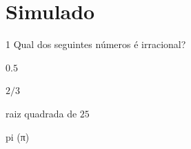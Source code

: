 



%




\chapter[Simulado 3]{Simulado}

\num{1}  Qual dos seguintes números é irracional?

\begin{escolha}
\item $0.5$
\item $2/3$
\item raiz quadrada de $25$
\item pi (π)
\end{escolha}



